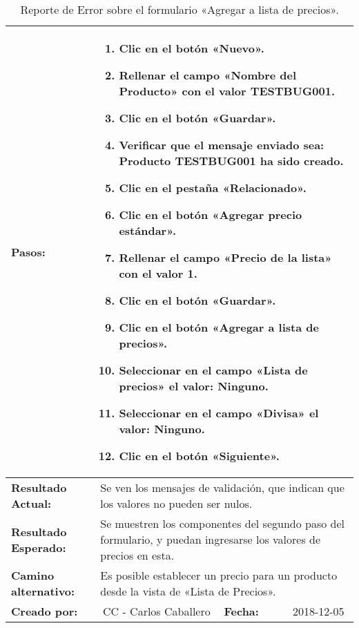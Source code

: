 \begin{table}
\begin{tabular}{|p{2.5cm}|p{2.8cm}|p{2.2cm}|p{2.8cm}|p{2.2cm}|}
\hline
\footnotesize{\textbf{Pasos:}} &
\multicolumn{4}{p{11.8cm}|}{\footnotesize{
\vspace{-3mm}
\begin{enumerate}
\item Clic en el botón «Nuevo».
\item Rellenar el campo «Nombre del Producto» con el valor \textbf{TESTBUG001}.
\item Clic en el botón «Guardar».
\item Verificar que el mensaje enviado sea:
    \textbf{Producto TESTBUG001 ha sido creado}.
\item Clic en el pestaña «Relacionado».
\item Clic en el botón «Agregar precio estándar».
\item Rellenar el campo «Precio de la lista» con el valor \textbf{1}.
\item Clic en el botón «Guardar».
\item Clic en el botón «Agregar a lista de precios».
\item Seleccionar en el campo «Lista de precios» el valor: \textbf{Ninguno}.
\item Seleccionar en el campo «Divisa» el valor: \textbf{Ninguno}.
\item Clic en el botón «Siguiente».
\end{enumerate}
\vspace{-5mm}
}} \\
\hline
\footnotesize{\textbf{Resultado Actual:}} &
\multicolumn{4}{p{12.4cm}|}{\footnotesize{Se ven los mensajes de validación,
que indican que los valores no pueden ser nulos.}} \\
\hline
\footnotesize{\textbf{Resultado Esperado:}} &
\multicolumn{4}{p{12.4cm}|}{\footnotesize{Se muestren los componentes del
segundo paso del formulario, y puedan ingresarse los valores de precios en esta.
}} \\
\hline
\footnotesize{\textbf{Camino alternativo:}} &
\multicolumn{4}{p{12.4cm}|}{\footnotesize{Es posible establecer un precio para
un producto desde la vista de «Lista de Precios».
}} \\
\hline
\footnotesize{\textbf{Creado por:}} &
\multicolumn{2}{c|}{\footnotesize{CC - Carlos Caballero}} &
\footnotesize{\textbf{Fecha:}} &
\multicolumn{1}{c|}{\footnotesize{2018-12-05}} \\
\hline
\end{tabular}
\caption{Reporte de Error sobre el formulario «Agregar a lista de precios».}
\label{br}
\end{table}

